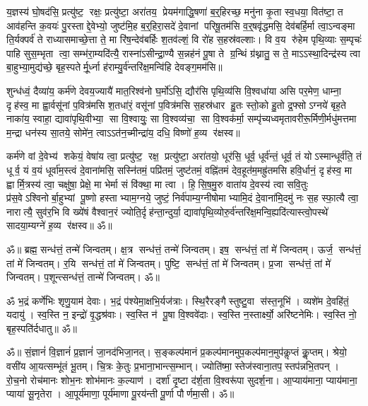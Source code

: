 य॒ज्ञस्य॑ घो॒षद॑सि॒ प्रत्यु॑ष्ट॒ रक्षः॒ प्रत्यु॑ष्टा॒ अरा॑तय॒ प्रेयम॑गाद्धि॒षणा॑ ब॒र्॒हिरच्छ॒
मनु॑ना कृ॒ता स्व॒धया॒ वित॑ष्टा॒ त आव॑हन्ति क॒वयः॑ पु॒रस्ताद्दे॒वेभ्यो॒ जुष्ट॑मि॒ह ब॒र्॒हिरा॒सदे॑
दे॒वानां परिषू॒तम॑सि व॒र्॒षवृ॑द्धमसि॒ देव॑बर्हि॒र्मा त्वा॒ऽन्वङ्मा ति॒र्यक्पर्व॑ ते
राध्यासमाच्छे॒त्ता ते॒ मा रि॑ष॒न्देव॑बर्हिः श॒तव॑ल्शं॒ वि रो॑ह स॒हस्र॑वल्शाः। वि व॒य
रु॑हेम पृथि॒व्याः स॒म्पृचः॑ पाहि सुस॒म्भृता त्वा॒ सम्भ॑रा॒म्यदि॑त्यै॒ रास्ना॑ऽसीन्द्रा॒ण्यै
स॒न्नह॑नं पू॒षा ते ग्र॒न्थिं ग्र॑थ्नातु॒ स ते॒ माऽऽस्था॒दिन्द्र॑स्य त्वा बा॒हुभ्या॒मुद्य॑च्छे॒
बृह॒स्पतेर्मू॒र्ध्ना ह॑राम्यु॒र्व॑न्तरि॑क्ष॒मन्वि॑हि देवङ्ग॒मम॑सि॥

शुन्ध॑ध्वं॒ दैव्या॑य॒ कर्म॑णे देवय॒ज्यायै॑ मात॒रिश्व॑नो घ॒र्मो॑ऽसि॒ द्यौर॑सि पृथि॒व्य॑सि वि॒श्वधा॑या
असि पर॒मेण॒ धाम्ना॒ दृह॑स्व॒ मा ह्वा॒र्वसू॑नां प॒वित्र॑मसि श॒तधा॑रं॒ वसू॑नां प॒वित्र॑मसि
स॒हस्र॑धार हु॒तः स्तो॒को हु॒तो द्र॒फ्सोऽग्नये॑ बृह॒ते नाका॑य॒ स्वाहा॒ द्यावा॑पृथि॒वीभ्या॒ सा
वि॒श्वायुः॒ सा वि॒श्वव्य॑चा॒ सा वि॒श्वक॑र्मा॒ सम्पृ॑च्यध्वमृतावरीरू॒र्मिणी॒र्मधु॑मत्तमा म॒न्द्रा
धन॑स्य सा॒तये॒ सोमे॑न॒ त्वाऽऽत॑न॒च्मीन्द्रा॑य॒ दधि॒ विष्णो॑ ह॒व्य र॑क्षस्व॥ 

कर्म॑णे वां दे॒वेभ्य॑ शकेयं॒ वेषा॑य त्वा॒ प्रत्यु॑ष्ट॒ रक्ष॒ प्रत्यु॑ष्टा॒ अरा॑तयो॒ धूर॑सि॒
धूर्व॒ धूर्व॑न्तं॒ धूर्व॒ तं योऽस्मान्धूर्व॑ति॒ तं धूर्व॒ यं व॒यं धूर्वा॑म॒स्त्वं दे॒वाना॑मसि॒
सस्नि॑तमं॒ पप्रि॑तमं॒ जुष्ट॑तमं॒ वह्नि॑तमं देव॒हूत॑म॒मह्रु॑तमसि हवि॒र्धानं॒ दृह॑स्व॒ मा
ह्वार्मि॒त्रस्य॑ त्वा॒ चक्षु॑षा॒ प्रेक्षे॒ मा भेर्मा सं वि॑क्था॒ मा त्वा।
हि॒सि॒ष॒मु॒रु वाता॑य दे॒वस्य॑ त्वा सवि॒तुः प्र॑स॒वेऽश्विनोर्बा॒हुभ्यां पू॒ष्णो
हस्ताभ्याम॒ग्नये॒ जुष्टं॒ निर्व॑पाम्य॒ग्नीषोमाभ्यामि॒दं दे॒वाना॑मि॒दमु॑ नः स॒ह स्फा॒त्यै त्वा॒
नारात्यै॒ सुव॑र॒भि वि ख्ये॑षं वैश्वान॒रं ज्योति॒र्दृह॑न्ता॒न्दुर्या॒
द्यावा॑पृथि॒व्योरु॒र्व॑न्तरि॑क्ष॒मन्वि॒ह्यदि॑त्यास्त्वो॒पस्थे॑ सादया॒म्यग्ने॑ ह॒व्य र॑क्षस्व॥ ॐ॥

ॐ॥ ब्रह्म॒ सन्ध॑त्तं॒ तन्मे॑ जिन्वतम्।
क्ष॒त्र सन्ध॑त्तं॒ तन्मे॑ जिन्वतम्।
इष॒ सन्ध॑त्तं॒ तां मे॑ जिन्वतम्।
ऊर्ज॒ सन्ध॑त्तं॒ तां मे॑ जिन्वतम्।
र॒यि सन्ध॑त्तं॒ तां मे॑ जिन्वतम्।
पुष्टि॒ सन्ध॑त्तं॒ तां मे॑ जिन्वतम्।
प्र॒जा सन्ध॑त्तं॒ तां मे॑ जिन्वतम्।
प॒शून्त्सन्ध॑त्तं॒ तान्मे॑ जिन्वतम्। ॐ॥

ॐ भ॒द्रं कर्णे॑भिः शृणु॒याम॑ देवाः। भ॒द्रं प॑श्येमा॒क्षभि॒र्यज॑त्राः। 
स्थि॒रैरङ्गैस्तुष्टु॒वा स॑स्त॒नूभि॑। व्यशे॑म दे॒वहि॑तं॒ यदायु॑। 
स्व॒स्ति न॒ इन्द्रो॑ वृ॒द्धश्र॑वाः। स्व॒स्ति न॑ पू॒षा वि॒श्ववे॑दाः। 
स्व॒स्ति न॒स्तार्क्ष्यो॒ अरि॑ष्टनेमिः। स्व॒स्ति नो॒ बृह॒स्पति॑र्दधातु॥ ॐ॥

ॐ॥ सं॒ज्ञानं॑ वि॒ज्ञानं॑ प्र॒ज्ञानं॑ जा॒नद॑भिजा॒नत्।
स॒ङ्कल्प॑मानं प्र॒कल्प॑मानमुप॒\-कल्प॑मान॒मुप॑कॢप्तं कॢ॒प्तम्।
श्रेयो॒ वसी॑य आ॒यत्सम्भू॑तं भू॒तम्।
चि॒त्रः के॒तुः प्र॒भाना॒भान्त्स॒म्भान्।
ज्योति॑ष्मा॒स्तेज॑स्वाना॒तप॒\-स्तप॑न्नभि॒\-तपन्।
रो॒च॒नो रोच॑मानः शोभ॒नः शोभ॑मानः क॒ल्याण॑।
दर्\mbox{}शा॑ दृ॒ष्टा द॑र्\mbox{}श॒ता वि॒श्वरू॑पा सुदर्\mbox{}श॒ना।
आ॒प्याय॑माना॒ प्याय॑माना॒ प्याया॑ सू॒नृतेरा।
आ॒पूर्य॑माणा॒ पूर्य॑माणा पू॒रय॑न्ती पू॒र्णा पौर्णमा॒सी। ॐ॥


